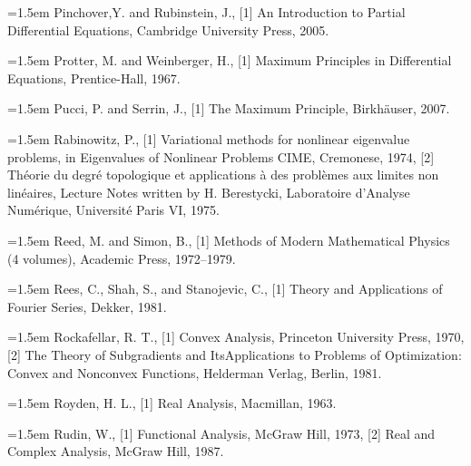 \noindent\hangindent=1.5em Pinchover,Y. and Rubinstein, J., \hypertarget{ref:PinchoverRubinstein-1}{[1]} An Introduction to Partial Differential Equations, Cambridge University Press, 2005.\par{}
\noindent\hangindent=1.5em Protter, M. and Weinberger, H., \hypertarget{ref:ProtterWeinberger-1}{[1]} Maximum Principles in Differential Equations, Prentice-Hall, 1967.\par{}
\noindent\hangindent=1.5em Pucci, P. and Serrin, J., \hypertarget{ref:PucciSerrin-1}{[1]} The Maximum Principle, Birkhäuser, 2007.\par{}
\noindent\hangindent=1.5em Rabinowitz, P., \hypertarget{ref:Rabinowitz-1}{[1]} Variational methods for nonlinear eigenvalue problems, in Eigenvalues of Nonlinear Problems CIME, Cremonese, 1974, \hypertarget{ref:Rabinowitz-2}{[2]} Théorie du degré topologique et applications à des problèmes aux limites non linéaires, Lecture Notes written by H. Berestycki, Laboratoire d'Analyse Numérique, Université Paris VI, 1975.\par{}
\noindent\hangindent=1.5em Reed, M. and Simon, B., \hypertarget{ref:ReedSimon-1}{[1]} Methods of Modern Mathematical Physics (4 volumes), Academic Press, 1972--1979.\par{}
\noindent\hangindent=1.5em Rees, C., Shah, S., and Stanojevic, C., \hypertarget{ref:ReesShahStanojevic-1}{[1]} Theory and Applications of Fourier Series, Dekker, 1981.\par{}
\noindent\hangindent=1.5em Rockafellar, R. T., \hypertarget{ref:Rockafellar-1}{[1]} Convex Analysis, Princeton University Press, 1970, \hypertarget{ref:Rockafellar-2}{[2]} The Theory of Subgradients and ItsApplications to Problems of Optimization: Convex and Nonconvex Functions, Helderman Verlag, Berlin, 1981.\par{}
\noindent\hangindent=1.5em Royden, H. L., \hypertarget{ref:Royden-1}{[1]} Real Analysis, Macmillan, 1963.\par{}
\noindent\hangindent=1.5em Rudin, W., \hypertarget{ref:Rudin-1}{[1]} Functional Analysis, McGraw Hill, 1973, \hypertarget{ref:Rudin-2}{[2]} Real and Complex Analysis, McGraw Hill, 1987.\par{}
